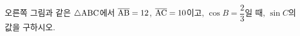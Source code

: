\noindent\begin{minipage}[t]{0.58\linewidth}\vspace{0pt}\raggedright 오른쪽 그림과 같은 $\triangle\mathrm{ABC}$에서 $\overline{\mathrm{AB}}=12$, $\overline{\mathrm{AC}}=10$이고, $\cos B=\dfrac{2}{3}$일 때, $\sin C$의 값을 구하시오.\end{minipage}\hfill\begin{minipage}[t]{0.4\linewidth}\vspace{0pt}\centering \resizebox{\ifdim\width>\linewidth\linewidth\else\width\fi}{!}{}\end{minipage}\par
